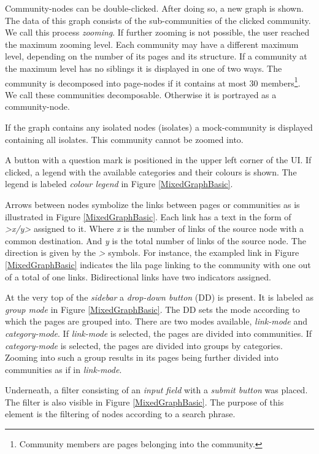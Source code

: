 Community-nodes can be double-clicked. After doing so, a new graph is shown. The data of this graph consists of the sub-communities of the clicked community. We call this process \textit{zooming}. If further zooming is not possible, the user reached the maximum zooming level. Each community may have a different maximum level, depending on the number of its pages and its structure. If a community at the maximum level has no siblings it is displayed in one of two ways. The community is decomposed into page-nodes if it contains at most 30 members\footnote{Community members are pages belonging into the community.}. We call these communities decomposable. Otherwise it is portrayed as a community-node.

If the graph contains any isolated nodes (isolates) a mock-community is displayed containing all isolates. This community cannot be zoomed into. 

A button with a question mark is positioned in the upper left corner of the UI. If clicked, a legend with the available categories and their colours is shown. The legend is labeled \textit{colour legend} in Figure \ref{MixedGraphBasic}.

Arrows between nodes symbolize the links between pages or communities as is illustrated in Figure \ref{MixedGraphBasic}. Each link has a text in the form of \textit{>x/y>} assigned to it. Where \textit{x} is the number of links of the source node with a common destination. And \textit{y} is the total number of links of the source node. The direction is given by the \textit{>} symbols. For instance, the exampled link in Figure \ref{MixedGraphBasic} indicates the lila page linking to the community with one out of a total of one links. Bidirectional links have two indicators assigned.

At the very top of the \textit{sidebar} a \textit{drop-down button} (DD) is present. It is labeled as \textit{group mode} in Figure \ref{MixedGraphBasic}. The DD sets the mode according to which the pages are grouped into. There are two modes available, \textit{link-mode} and \textit{category-mode}. If \textit{link-mode} is selected, the pages are divided into communities. If \textit{category-mode} is selected, the pages are divided into groups by categories. Zooming into such a group results in its pages being further divided into communities as if in \textit{link-mode}. 

Underneath, a filter consisting of an \textit{input field} with a \textit{submit button} was placed. The filter is also visible in Figure \ref{MixedGraphBasic}. The purpose of this element is the filtering of nodes according to a search phrase.

